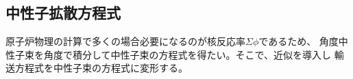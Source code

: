 
\subsection{中性子拡散方程式}
原子炉物理の計算で多くの場合必要になるのが核反応率$\Sigma \phi$であるため、
角度中性子束を角度で積分して中性子束の方程式を得たい。そこで、近似を導入し
輸送方程式を中性子束の方程式に変形する。






\printbibliography[segment=\therefsegment,heading=subbibliography]

\newpage